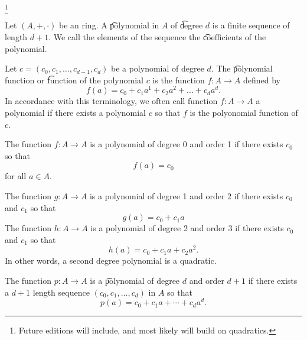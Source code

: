 

\footnote{Future editions will include, and most likely will build on quadratics.}


Let $(A, +, \cdot)$ be an ring.
A \t{polynomial} in $A$ of \t{degree} $d$ is a finite sequence of length $d+1$.
We call the elements of the sequence the \t{coefficients} of the polynomial.

Let $c = (c_0, c_1, \dots, c_{d-1}, c_d)$ be a polynomial of degree $d$.
The \t{polynomial function} or \t{function of the polynomial} $c$ is the function $f: A \to A$ defined by
\[
  f(a) = c_0 + c_1a^1 + c_2a^2 + \dots + c_da^d.
\]
In accordance with this terminology, we often call  function $f: A \to A$ a polynomial if there exists a polynomial $c$ so that $f$ is the polyonomial function of $c$.

The function $f: A \to A$ is a polynomial of degree 0 and order 1 if there exists $c_0$ so that
\[
  f(a) = c_0
\]
for all $a \in A$.

The function $g: A \to A$ is a polynomial of degree 1 and order 2 if there exists $c_0$ and $c_1$ so that
\[
  g(a) = c_0 + c_1a
\]
The function $h: A \to A$ is a polynomial of degree 2 and order 3 if there exists $c_0$ and $c_1$ so that
\[
  h(a) = c_0 + c_1a + c_2a^2.
\]
In other words, a second degree polynomial is a quadratic.

The function $p: A \to A$ is a \t{polynomial} of degree $d$ and order $d+1$ if there exists a $d+1$ length sequence $(c_0, c_1, \dots, c_d)$ in $A$ so that
\[
  p(a) = c_0 + c_1a + \cdots + c_da^d.
\]

